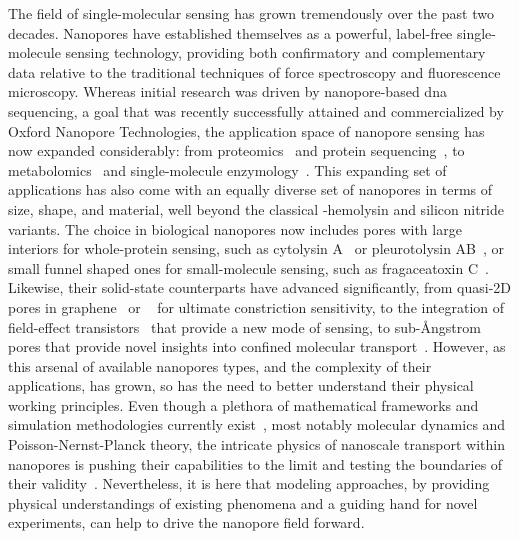 The field of single-molecular sensing has grown tremendously over the past two decades. Nanopores have
established themselves as a powerful, label-free single-molecule sensing technology, providing both
confirmatory and complementary data relative to the traditional techniques of force spectroscopy and
fluorescence microscopy. Whereas initial research was driven by nanopore-based \gls{dna} sequencing, a goal
that was recently successfully attained and commercialized by Oxford Nanopore Technologies, the application
space of nanopore sensing has now expanded considerably: from proteomics~\cite{Yusko-2017,Houghtaling-2019}
and protein sequencing~\cite{Restrepo-Perez-2018}, to metabolomics~\cite{Zernia-2020} and single-molecule
enzymology~\cite{Galenkamp-2020,Willems-VanMeervelt-2017}. This expanding set of applications has also come
with an equally diverse set of nanopores in terms of size, shape, and material, well beyond the classical
\ta-hemolysin and silicon nitride variants. The choice in biological nanopores now includes pores with large
interiors for whole-protein sensing, such as cytolysin A~\cite{Soskine-2012} or pleurotolysin
AB~\cite{Huang-2020}, or small funnel shaped ones for small-molecule sensing, such as fragaceatoxin
C~\cite{Huang-2017,Restrepo-Perez-2019a}. Likewise, their solid-state counterparts have advanced
significantly, from quasi-2D pores in graphene~\cite{Fischbein-2008} or ~\cite{Feng-2015b} for
ultimate constriction sensitivity, to the integration of field-effect transistors~\cite{Ren-2020} that provide
a new mode of sensing, to sub-\AA{}ngstrom pores that provide novel insights into confined molecular
transport~\cite{Rigo-2019}. However, as this arsenal of available nanopores types, and the complexity of their
applications, has grown, so has the need to better understand their physical working principles. Even though a
plethora of mathematical frameworks and simulation methodologies currently exist~\cite{Maffeo-2012}, most
notably molecular dynamics and Poisson-Nernst-Planck theory, the intricate physics of nanoscale transport
within nanopores is pushing their capabilities to the limit and testing the boundaries of their
validity~\cite{Collins-2012}. Nevertheless, it is here that modeling approaches, by providing physical
understandings of existing phenomena and a guiding hand for novel experiments, can help to drive the nanopore
field forward.


\cleardoublepage

